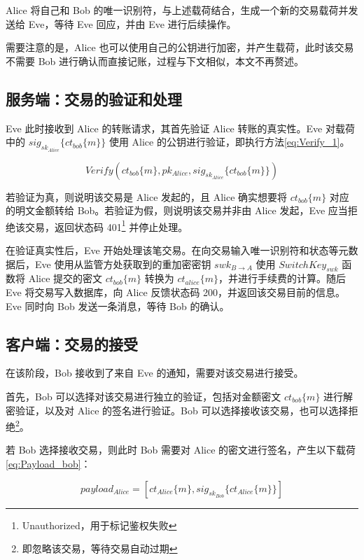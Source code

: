 Alice 将自己和 Bob 的唯一识别符，与上述载荷结合，生成一个新的交易载荷并发送给 Eve，等待 Eve 回应，并由 Eve 进行后续操作。

需要注意的是，Alice 也可以使用自己的公钥进行加密，并产生载荷，此时该交易不需要 Bob 进行确认而直接记账，过程与下文相似，本文不再赘述。

\subsection{服务端：交易的验证和处理}

Eve 此时接收到 Alice 的转账请求，其首先验证 Alice 转账的真实性。Eve 对载荷中的 $sig_{sk_{Alice}}\{ct_{bob}\{m\}\}$ 使用 Alice 的公钥进行验证，即执行方法\eqref{eq:Verify_1}。

\begin{equation} \label{eq:Verify_1}
    Verify(ct_{bob}\{m\}, pk_{Alice}, sig_{sk_{Alice}}\{ct_{bob}\{m\}\})
\end{equation}

若验证为真，则说明该交易是 Alice 发起的，且 Alice 确实想要将 $ct_{bob}\{m\}$  对应的明文金额转给 Bob。若验证为假，则说明该交易并非由 Alice 发起，Eve 应当拒绝该交易，返回状态码 401\footnote{Unauthorized，用于标记鉴权失败} 并停止处理。

在验证真实性后，Eve 开始处理该笔交易。在向交易输入唯一识别符和状态等元数据后，Eve 使用从监管方处获取到的重加密密钥 $swk_{B \rightarrow A}$ 使用 $SwitchKey_{swk}$ 函数将 Alice 提交的密文 $ct_{bob}\{m\}$ 转换为 $ct_{alice}\{m\}$，并进行手续费的计算。随后 Eve 将交易写入数据库，向 Alice 反馈状态码 200，并返回该交易目前的信息。Eve 同时向 Bob 发送一条消息，等待 Bob 的确认。

\subsection{客户端：交易的接受}

在该阶段，Bob 接收到了来自 Eve 的通知，需要对该交易进行接受。

首先，Bob 可以选择对该交易进行独立的验证，包括对金额密文 $ct_{bob}\{m\}$ 进行解密验证，以及对 Alice 的签名进行验证。Bob 可以选择接收该交易，也可以选择拒绝\footnote{即忽略该交易，等待交易自动过期}。

若 Bob 选择接收交易，则此时 Bob 需要对 Alice 的密文进行签名，产生以下载荷\eqref{eq:Payload_bob}：

\begin{equation} \label{eq:Payload_bob}
    payload_{Alice} = [ct_{Alice}\{m\}, sig_{sk_{Bob}}\{ct_{Alice}\{m\}\}]
\end{equation}

